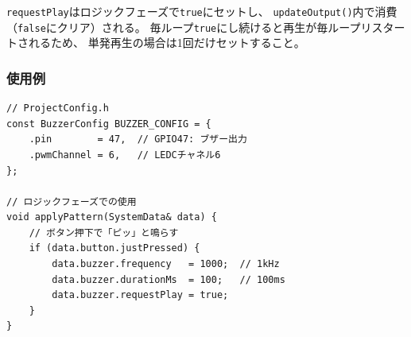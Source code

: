 \begin{notebox}
\texttt{requestPlay}はロジックフェーズで\texttt{true}にセットし、
\texttt{updateOutput()}内で消費（\texttt{false}にクリア）される。
毎ループ\texttt{true}にし続けると再生が毎ループリスタートされるため、
単発再生の場合は1回だけセットすること。
\end{notebox}

\subsubsection{使用例}

\begin{lstlisting}[style=cppstyle, caption={BuzzerModuleの使用例}]
// ProjectConfig.h
const BuzzerConfig BUZZER_CONFIG = {
    .pin        = 47,  // GPIO47: ブザー出力
    .pwmChannel = 6,   // LEDCチャネル6
};

// ロジックフェーズでの使用
void applyPattern(SystemData& data) {
    // ボタン押下で「ピッ」と鳴らす
    if (data.button.justPressed) {
        data.buzzer.frequency   = 1000;  // 1kHz
        data.buzzer.durationMs  = 100;   // 100ms
        data.buzzer.requestPlay = true;
    }
}
\end{lstlisting}
